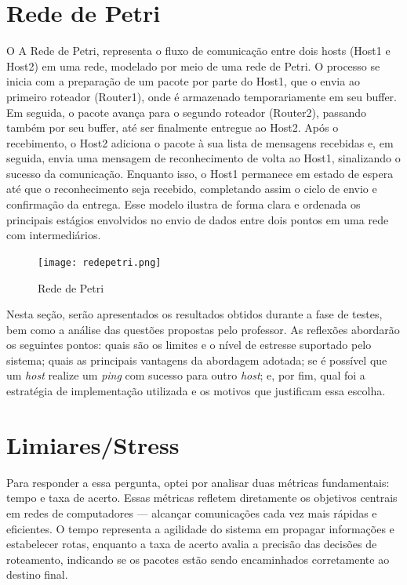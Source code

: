 \documentclass[12pt,a4paper]{report}
\begin{document}
\section{Rede de Petri}
O A Rede de Petri, representa o fluxo de comunicação entre dois hosts (Host1 e Host2) em uma rede, modelado por meio de uma rede de Petri. O processo se inicia com a preparação de um pacote por parte do Host1, que o envia ao primeiro roteador (Router1), onde é armazenado temporariamente em seu buffer. Em seguida, o pacote avança para o segundo roteador (Router2), passando também por seu buffer, até ser finalmente entregue ao Host2. Após o recebimento, o Host2 adiciona o pacote à sua lista de mensagens recebidas e, em seguida, envia uma mensagem de reconhecimento de volta ao Host1, sinalizando o sucesso da comunicação. Enquanto isso, o Host1 permanece em estado de espera até que o reconhecimento seja recebido, completando assim o ciclo de envio e confirmação da entrega. Esse modelo ilustra de forma clara e ordenada os principais estágios envolvidos no envio de dados entre dois pontos em uma rede com intermediários.

\begin{figure}[h!]
    \centering
    \texttt{[image: redepetri.png]}
    \caption{Rede de Petri}
    \label{fig:classes}
\end{figure}

Nesta seção, serão apresentados os resultados obtidos durante a fase de testes, bem como a análise das questões propostas pelo professor. As reflexões abordarão os seguintes pontos: quais são os limites e o nível de estresse suportado pelo sistema; quais as principais vantagens da abordagem adotada; se é possível que um \textit{host} realize um \textit{ping} com sucesso para outro \textit{host}; e, por fim, qual foi a estratégia de implementação utilizada e os motivos que justificam essa escolha.

\section{Limiares/Stress}
Para responder a essa pergunta, optei por analisar duas métricas fundamentais: tempo e taxa de acerto. Essas métricas refletem diretamente os objetivos centrais em redes de computadores — alcançar comunicações cada vez mais rápidas e eficientes. O tempo representa a agilidade do sistema em propagar informações e estabelecer rotas, enquanto a taxa de acerto avalia a precisão das decisões de roteamento, indicando se os pacotes estão sendo encaminhados corretamente ao destino final.
\end{document}
